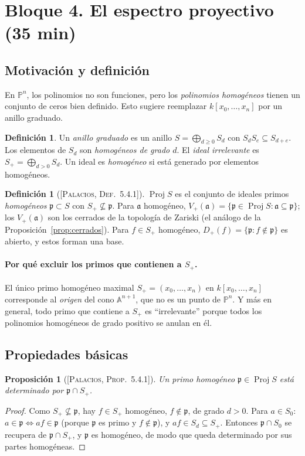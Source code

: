 \documentclass[11pt,a4paper]{article}
\newcommand{\Proj}{\operatorname{Proj}}
\newcommand{\A}{\mathbb{A}}
\newcommand{\PP}{\mathbb{P}}
\newcommand{\pp}{\mathfrak{p}}
\newcommand{\aaa}{\mathfrak{a}}
\theoremstyle{plain}
\newtheorem{proposicion}[teorema]{Proposición}
\theoremstyle{definition}
\newtheorem{definicion}[teorema]{Definición}
\theoremstyle{remark}
\newcommand{\libro}[1]{\textsc{[Palacios, #1]}}
\begin{document}
\section{Bloque 4. El espectro proyectivo (35 min)}

\subsection{Motivación y definición}

En $\PP^n$, los polinomios no son funciones, pero los \emph{polinomios homogéneos} tienen un conjunto de ceros bien definido. Esto sugiere reemplazar $k[x_0,\dots,x_n]$ por un anillo graduado.

\begin{definicion}
Un \emph{anillo graduado} es un anillo $S=\bigoplus_{d\ge0}S_d$ con $S_dS_e\subseteq S_{d+e}$. Los elementos de $S_d$ son \emph{homogéneos de grado $d$}. El \emph{ideal irrelevante} es $S_+=\bigoplus_{d>0}S_d$. Un ideal es \emph{homogéneo} si está generado por elementos homogéneos.
\end{definicion}

\begin{definicion}[{\libro{Def.~5.4.1}}]
$\Proj S$ es el conjunto de ideales primos \emph{homogéneos} $\pp\subset S$ con $S_+\not\subseteq\pp$. Para $\aaa$ homogéneo, $V_+(\aaa)=\{\pp\in\Proj S:\aaa\subseteq\pp\}$; los $V_+(\aaa)$ son los cerrados de la topología de Zariski (el análogo de la Proposición~\ref{prop:cerrados}). Para $f\in S_+$ homogéneo, $D_+(f)=\{\pp:f\notin\pp\}$ es abierto, y estos forman una base.
\end{definicion}

\paragraph{Por qué excluir los primos que contienen a $S_+$.} El único primo homogéneo maximal $S_+=(x_0,\dots,x_n)$ en $k[x_0,\dots,x_n]$ corresponde al \emph{origen} del cono $\A^{n+1}$, que no es un punto de $\PP^n$. Y más en general, todo primo que contiene a $S_+$ es ``irrelevante'' porque todos los polinomios homogéneos de grado positivo se anulan en él.

\subsection{Propiedades básicas}

\begin{proposicion}[{\libro{Prop.~5.4.1}}]\label{prop:5.4.1}
Un primo homogéneo $\pp\in\Proj S$ está determinado por $\pp\cap S_+$.
\end{proposicion}
\begin{proof}
Como $S_+\not\subseteq\pp$, hay $f\in S_+$ homogéneo, $f\notin\pp$, de grado $d>0$. Para $a\in S_0$: $a\in\pp\iff af\in\pp$ (porque $\pp$ es primo y $f\notin\pp$), y $af\in S_d\subseteq S_+$. Entonces $\pp\cap S_0$ se recupera de $\pp\cap S_+$, y $\pp$ es homogéneo, de modo que queda determinado por sus partes homogéneas.
\end{proof}
\end{document}
